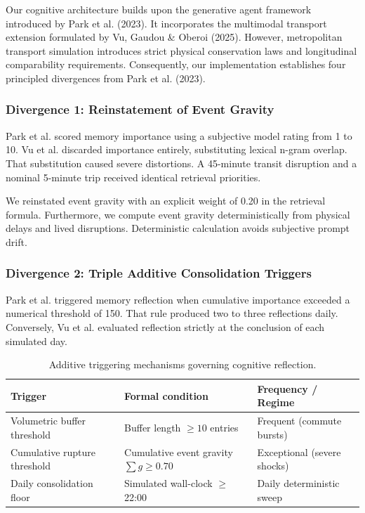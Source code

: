 Our cognitive architecture builds upon the generative agent framework introduced by Park et al. (2023). It incorporates the multimodal transport extension formulated by Vu, Gaudou \& Oberoi (2025). However, metropolitan transport simulation introduces strict physical conservation laws and longitudinal comparability requirements. Consequently, our implementation establishes four principled divergences from Park et al. (2023).

\subsubsection{Divergence 1: Reinstatement of Event Gravity}
Park et al. scored memory importance using a subjective model rating from 1 to 10. Vu et al. discarded importance entirely, substituting lexical n-gram overlap. That substitution caused severe distortions. A 45-minute transit disruption and a nominal 5-minute trip received identical retrieval priorities.

We reinstated event gravity with an explicit weight of 0.20 in the retrieval formula. Furthermore, we compute event gravity deterministically from physical delays and lived disruptions. Deterministic calculation avoids subjective prompt drift.

\subsubsection{Divergence 2: Triple Additive Consolidation Triggers}
Park et al. triggered memory reflection when cumulative importance exceeded a numerical threshold of 150. That rule produced two to three reflections daily. Conversely, Vu et al. evaluated reflection strictly at the conclusion of each simulated day.

\begin{table}[h]
\centering
\caption{Additive triggering mechanisms governing cognitive reflection.}
\label{tab-triggers}
\small
\begin{tabular}{lll}
\toprule
\textbf{Trigger} & \textbf{Formal condition} & \textbf{Frequency / Regime} \\
\midrule
Volumetric buffer threshold & Buffer length $\ge 10$ entries & Frequent (commute bursts) \\
Cumulative rupture threshold & Cumulative event gravity $\sum g \ge 0.70$ & Exceptional (severe shocks) \\
Daily consolidation floor & Simulated wall-clock $\ge$ 22:00 & Daily deterministic sweep \\
\bottomrule
\end{tabular}
\end{table}

